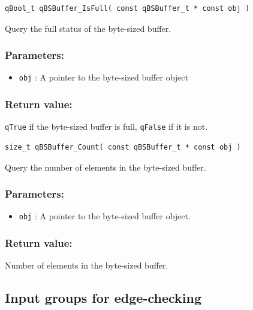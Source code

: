 \documentclass{article}
\begin{document}
\noindent\hrulefill

\begin{lstlisting}[style=CStyle]
qBool_t qBSBuffer_IsFull( const qBSBuffer_t * const obj )
\end{lstlisting}

Query the full status of the byte-sized buffer. 

\subsubsection*{Parameters:}
\begin{itemize}
    \item \lstinline{obj} : A pointer to the byte-sized buffer object
\end{itemize}

\subsubsection*{Return value:}
\lstinline{qTrue} if the byte-sized buffer is full, \lstinline{qFalse} if it is not.


\noindent\hrulefill

\begin{lstlisting}[style=CStyle]
size_t qBSBuffer_Count( const qBSBuffer_t * const obj )
\end{lstlisting}

Query the number of elements in the byte-sized buffer. 

\subsubsection*{Parameters:}
\begin{itemize}
    \item \lstinline{obj} : A pointer to the byte-sized buffer object.
\end{itemize}

\subsubsection*{Return value:}
Number of elements in the byte-sized buffer.



\subsection{Input groups for edge-checking}
\end{document}
